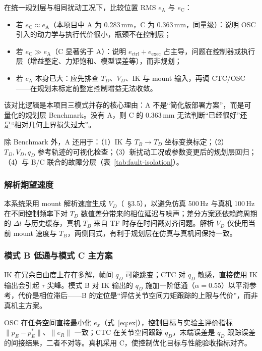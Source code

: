 \documentclass[UTF8, a4paper, 12pt]{ctexart}
\begin{document}
在统一规划层与相同扰动工况下，比较位置 RMS $e_{\mathrm{A}}$ 与 $e_{\mathrm{C}}$：
\begin{itemize}[leftmargin=2em]
    \item 若 $e_{\mathrm{C}} \approx e_{\mathrm{A}}$（本项目中 A 为 0.283\,mm，C 为 0.363\,mm，同量级）：说明 OSC 引入的动力学与执行代价很小，瓶颈不在控制层；
    \item 若 $e_{\mathrm{C}} \gg e_{\mathrm{A}}$（C 显著劣于 A）：说明 $e_{\mathrm{ctrl}}+e_{\mathrm{exec}}$ 占主导，问题在控制器或执行层（增益整定、力矩饱和、模型误差等），而非规划；
    \item 若 $e_{\mathrm{A}}$ 本身已大：应先排查 $T_D$、$V_D$、IK 与 mount 输入，再调 CTC/OSC——在规划未标定前整定控制增益无法收敛。
\end{itemize}

该对比逻辑是本项目三模式并存的核心理由：A 不是``简化版部署方案''，而是可量化的规划层 Benchmark。没有 A，则 C 的 0.363\,mm 无法判断``已经很好''还是``相对几何上界损失过大''。

除 Benchmark 外，A 还用于：（1）IK 与 $T_B\rightarrow T_D$ 坐标变换标定；（2）$T_D,V_D,q_D$ 参考轨迹的可视化检查；（3）新扰动工况或参数变更后的规划层回归；（4）与 B/C 联合的故障分层（表~\ref{tab:fault-isolation}）。

\subsubsection{解析期望速度}

本系统采用 mount 解析速度生成 $V_D$（~\S3.5），以避免仿真 500\,Hz 与真机 100\,Hz 在不同控制频率下对 $T_D$ 数值差分带来的相位延迟与噪声；差分方案还依赖跨周期的 $\Delta t$ 与历史缓存，真机 $T_B$ 来自 TF 时存在时间戳对齐问题。解析 $V_D$ 仅使用当前 mount 速度与 $T_B$，两侧同式，有利于规划层在仿真与真机间保持一致。

\subsubsection{模式 B 低通与模式 C 主方案}

IK 在冗余自由度上存在多解，帧间 $q_D$ 可能跳变；CTC 对 $\ddot{q}_D$ 敏感，直接使用 IK 输出会引起 $\tau$ 尖峰。模式 B 对 IK 输出的 $q_D$ 施加一阶低通（$\alpha=0.55$）以平滑参考，代价是相位滞后——B 的定位是``评估关节空间力矩跟踪的上限与代价''，而非真机主方案。

OSC 在任务空间直接最小化 $e_x$（式~\eqref{eq:ex}），控制目标与实验主评价指标 $\|p_E-p_E^*\|$、$\|e_R\|$ 一致；CTC 在关节空间跟踪 $q_D$，末端误差是 $q_D$ 跟踪误差的间接结果，二者不对等。真机采用 C，使控制优化目标与性能验收指标对齐。
\end{document}
